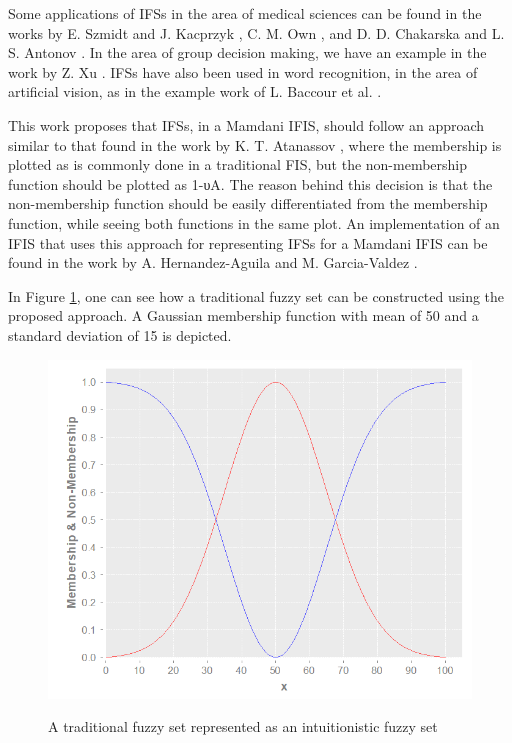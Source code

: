 Some applications of IFSs in the area of medical sciences can be found in the
works by E. Szmidt and J. Kacprzyk \cite{Szmidt2001}, C. M. Own \cite{Own2009},
and D. D. Chakarska and L. S. Antonov \cite{Antonov1995}. In the area of group
decision making, we have an example in the work by Z. Xu \cite{Xu2007}. IFSs
have also been used in word recognition, in the area of artificial vision, as in
the example work of L. Baccour et al. \cite{Baccour2008}.

This work proposes that IFSs, in a Mamdani IFIS, should follow an approach
similar to that found in the work by K. T. Atanassov \cite{Atanassov2003}, where
the membership is plotted as is commonly done in a traditional FIS, but the
non-membership function should be plotted as 1-υA. The reason behind this
decision is that the non-membership function should be easily differentiated
from the membership function, while seeing both functions in the same plot. An
implementation of an IFIS that uses this approach for representing IFSs for a
Mamdani IFIS can be found in the work by A. Hernandez-Aguila and
M. Garcia-Valdez \cite{Hernandez-aguila}.

In Figure \ref{figure:traditional-set-as-ifs}, one can see how a traditional
fuzzy set can be constructed using the proposed approach. A Gaussian membership
function with mean of 50 and a standard deviation of 15 is depicted.

\begin{figure}
\caption{A traditional fuzzy set represented as an intuitionistic fuzzy set}
\centering
\includegraphics[width=1.0\textwidth]{img/traditional-set-as-ifs.png}
\label{figure:traditional-set-as-ifs}
\end{figure}


